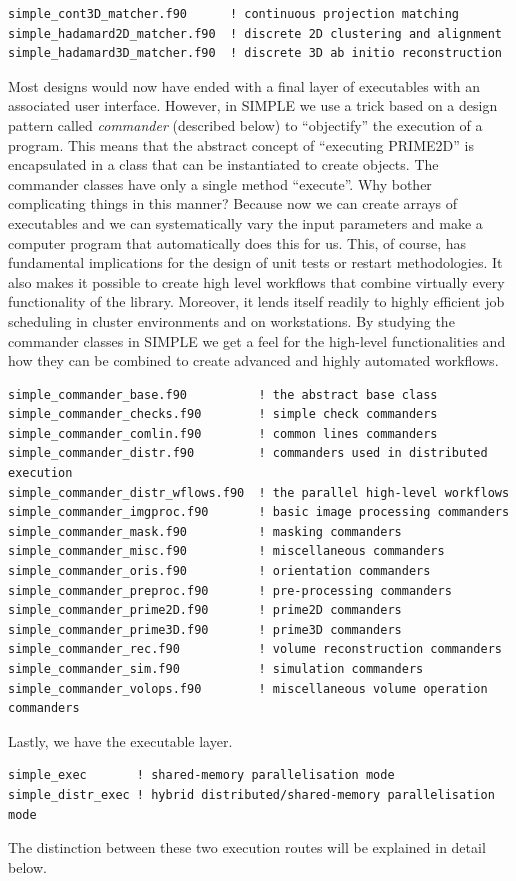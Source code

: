 \documentclass[a4paper,11pt]{article}
\begin{document}
\begin{verbatim}
simple_cont3D_matcher.f90      ! continuous projection matching
simple_hadamard2D_matcher.f90  ! discrete 2D clustering and alignment
simple_hadamard3D_matcher.f90  ! discrete 3D ab initio reconstruction
\end{verbatim}
Most designs would now have ended with a final layer of executables with an associated user interface. However, in SIMPLE we use a trick based on a design pattern called \textit{commander} (described below) to ``objectify'' the execution of a program. This means that the abstract concept of ``executing PRIME2D'' is encapsulated in a class that can be instantiated to create objects. The commander classes have only a single method ``execute''. Why bother complicating things in this manner? Because now we can create arrays of executables and we can systematically vary the input parameters and make a computer program that automatically does this for us. This, of course, has fundamental implications for the design of unit tests or restart methodologies. It also makes it possible to create high level workflows that combine virtually every functionality of the library. Moreover, it lends itself readily to highly efficient job scheduling in cluster environments and on workstations. By studying the commander classes in SIMPLE we get a feel for the high-level functionalities and how they can be combined to create advanced and highly automated workflows.
\begin{verbatim}
simple_commander_base.f90          ! the abstract base class
simple_commander_checks.f90        ! simple check commanders
simple_commander_comlin.f90        ! common lines commanders
simple_commander_distr.f90         ! commanders used in distributed execution
simple_commander_distr_wflows.f90  ! the parallel high-level workflows
simple_commander_imgproc.f90       ! basic image processing commanders
simple_commander_mask.f90          ! masking commanders
simple_commander_misc.f90          ! miscellaneous commanders
simple_commander_oris.f90          ! orientation commanders
simple_commander_preproc.f90       ! pre-processing commanders
simple_commander_prime2D.f90       ! prime2D commanders
simple_commander_prime3D.f90       ! prime3D commanders
simple_commander_rec.f90           ! volume reconstruction commanders
simple_commander_sim.f90           ! simulation commanders
simple_commander_volops.f90        ! miscellaneous volume operation commanders
\end{verbatim}
Lastly, we have the executable layer.
\begin{verbatim}
simple_exec       ! shared-memory parallelisation mode
simple_distr_exec ! hybrid distributed/shared-memory parallelisation mode 
\end{verbatim}
The distinction between these two execution routes will be explained in detail below.
\end{document}
